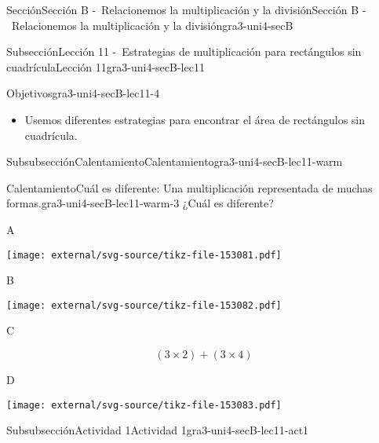 \documentclass[twoside,14pt,]{extarticle}
\begin{document}
\begin{sectionptx}{Sección}{Sección B -~Relacionemos la multiplicación y la división}{}{Sección B -~Relacionemos la multiplicación y la división}{}{}{gra3-uni4-secB}
\begin{subsectionptx}{Subsección}{Lección 11 -~Estrategias de multiplicación para rectángulos sin cuadrícula}{}{Lección 11}{}{}{gra3-uni4-secB-lec11}
\begin{objectives}{Objetivos}{gra3-uni4-secB-lec11-4}
%
\begin{itemize}[label=\textbullet]
\item{}Usemos diferentes estrategias para encontrar el área de rectángulos sin cuadrícula.%
\end{itemize}
\end{objectives}
%
%
\typeout{************************************************}
\typeout{************************************************}
%
\begin{subsubsectionptx}{Subsubsección}{Calentamiento}{}{Calentamiento}{}{}{gra3-uni4-secB-lec11-warm}
\begin{exploration}{Calentamiento}{Cuál es diferente: Una multiplicación representada de muchas formas.}{gra3-uni4-secB-lec11-warm-3}%
¿Cuál es diferente?%
\begin{sidebyside}{2}{0.05}{0.05}{0.1}%
\begin{sbspanel}{0.4}%
A%
\par
\texttt{[image: external/svg-source/tikz-file-153081.pdf]}
\end{sbspanel}%
\begin{sbspanel}{0.4}%
B%
\par
\texttt{[image: external/svg-source/tikz-file-153082.pdf]}
\end{sbspanel}%
\end{sidebyside}%
\begin{sidebyside}{2}{0.05}{0.05}{0.1}%
\begin{sbspanel}{0.4}%
C%
\par
%
\begin{equation*}
(3\times 2) + (3\times 4)
\end{equation*}
%
\end{sbspanel}%
\begin{sbspanel}{0.4}%
D%
\par
\texttt{[image: external/svg-source/tikz-file-153083.pdf]}
\end{sbspanel}%
\end{sidebyside}%
\end{exploration}%
\end{subsubsectionptx}
%
%
\typeout{************************************************}
\typeout{************************************************}
%
\begin{subsubsectionptx}{Subsubsección}{Actividad 1}{}{Actividad 1}{}{}{gra3-uni4-secB-lec11-act1}

\end{subsubsectionptx}
\end{subsectionptx}
\end{sectionptx}
\end{document}
